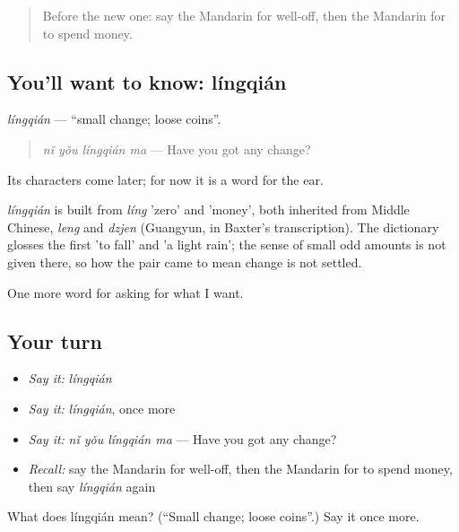 \label{lesson:ZH-C188-lingqian}



\begin{quote}
Before the new one: say the Mandarin for well-off, then the Mandarin for to spend money.
\end{quote}

\subsection*{You'll want to know: língqián}
\emph{língqián} — \textquotedblleft{}small change; loose coins\textquotedblright{}.

\begin{quote}
\emph{nǐ yǒu língqián ma} — Have you got any change?
\end{quote}

Its characters come later; for now it is a word for the ear.

\begin{cousinweb}
\emph{língqián} is built from \emph{líng} 'zero' and  'money', both inherited from Middle Chinese, \emph{leng} and \emph{dzjen} (Guangyun, in Baxter's transcription). The dictionary glosses the first 'to fall' and 'a light rain'; the sense of small odd amounts is not given there, so how the pair came to mean change is not settled.
\end{cousinweb}

\begin{grammarlens}[title={What you've built}]
One more word for asking for what I want.
\end{grammarlens}

\subsection*{Your turn}
\begin{itemize}
\raggedright
  \item \emph{Say it:} \emph{língqián}
  \item \emph{Say it:} \emph{língqián}, once more
  \item \emph{Say it:} \emph{nǐ yǒu língqián ma} — Have you got any change?
  \item \emph{Recall:} say the Mandarin for well-off, then the Mandarin for to spend money, then say \emph{língqián} again
\end{itemize}

\begin{tcolorbox}[breakable,colback=teal!4,colframe=teal!35!black,title={Before you move on}]
What does língqián mean? (\textquotedblleft{}Small change; loose coins\textquotedblright{}.) Say it once more.
\end{tcolorbox}
